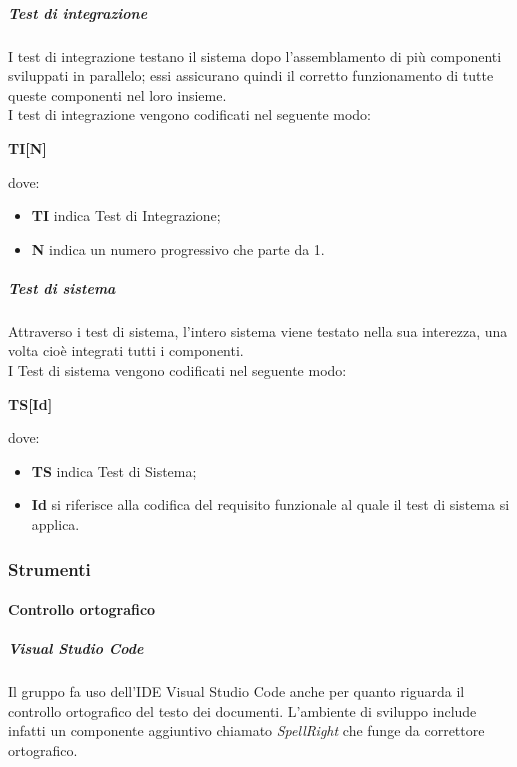 \documentclass[../norme-di-progetto.tex]{subfiles}
\begin{document}
\subparagraph*{Test di integrazione}
I test di integrazione testano il sistema dopo l'assemblamento di più componenti sviluppati in parallelo; essi assicurano quindi il corretto funzionamento di tutte queste componenti nel loro insieme. \\
I test di integrazione vengono codificati nel seguente modo:
\begin{center}
  \centering
  \textbf{TI[N]}
\end{center} dove:
\begin{itemize}
  \item \textbf{TI} indica Test di Integrazione;
  \item \textbf{N} indica un numero progressivo che parte da 1.
\end{itemize}

\subparagraph*{Test di sistema}
Attraverso i test di sistema, l'intero sistema viene testato nella sua interezza, una volta cioè integrati tutti i componenti. \\
I Test di sistema vengono codificati nel seguente modo:
\begin{center}
  \centering
  \textbf{TS[Id]}
\end{center} dove:
\begin{itemize}
  \item \textbf{TS} indica Test di Sistema;
  \item \textbf{Id} si riferisce alla codifica del requisito funzionale al quale il test di sistema si applica.
\end{itemize}

\subsubsection{Strumenti}
\paragraph{Controllo ortografico}
\subparagraph{Visual Studio Code}
Il gruppo fa uso dell'IDE Visual Studio Code anche per quanto riguarda il controllo ortografico del testo dei documenti. L'ambiente di sviluppo include infatti un componente aggiuntivo chiamato \textit{SpellRight} che funge da correttore ortografico.
\end{document}
